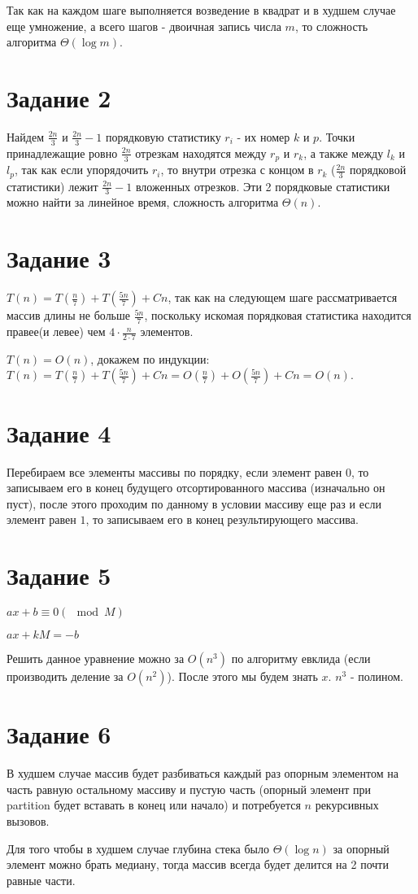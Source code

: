 \documentclass[a4paper,12pt]{article}
\begin{document}
Так как на каждом шаге выполняется возведение в квадрат и в худшем случае еще умножение, а всего шагов - двоичная запись числа $m$, то сложность алгоритма $\Theta(\log m)$.

\section*{Задание 2}
\hspace{0.5cm}
Найдем $\frac{2n}{3}$ и $\frac{2n}{3}-1$ порядковую статистику $r_{i}$ - их номер $k$ и $p$. Точки принадлежащие ровно $\frac{2n}{3}$ отрезкам находятся между $r_{p}$ и $r_{k}$, а также между $l_{k}$ и $l_{p}$, так как если упорядочить $r_{i}$, то внутри отрезка с концом в $r_{k}$ ($\frac{2n}{3}$ порядковой статистики) лежит $\frac{2n}{3}-1$ вложенных отрезков. Эти 2 порядковые статистики можно найти за линейное время, сложность алгоритма $\Theta(n)$.
  
\section*{Задание 3}
\hspace{0.5cm}
$T(n)=T(\frac{n}{7})+T(\frac{5n}{7})+Cn$, так как на следующем шаге рассматривается массив длины не больше $\frac{5n}{7}$, поскольку искомая порядковая статистика находится правее(и левее) чем $4\cdot\frac{n}{2\cdot 7}$ элементов.

$T(n)=O(n)$, докажем по индукции: $T(n)=T(\frac{n}{7})+T(\frac{5n}{7})+Cn= O(\frac{n}{7})+O(\frac{5n}{7})+Cn= O(n)$.

\section*{Задание 4}
\hspace{0.5cm}
Перебираем все элементы массивы по порядку, если элемент равен $0$, то записываем его в конец будущего отсортированного массива (изначально он пуст), после этого проходим по данному в условии массиву еще раз и если элемент равен $1$, то записываем его в конец результирующего массива.


\section*{Задание 5}
\hspace{0.5cm}
$ax+b\equiv 0(\mod M)$

$ax+kM=-b$

Решить данное уравнение можно за $O(n^3)$ по алгоритму евклида (если производить деление за $O(n^2)$). После этого мы будем знать $x$. $n^3$ - полином.


\section*{Задание 6}
\hspace{0.5cm}
В худшем случае массив будет разбиваться каждый раз опорным элементом на часть равную остальному массиву и пустую часть (опорный элемент при partition будет вставать в конец или начало) и потребуется $n$ рекурсивных вызовов.

Для того чтобы в худшем случае глубина стека было $\Theta(\log n)$ за опорный элемент можно брать медиану, тогда массив всегда будет делится на 2 почти равные части.
\end{document}
